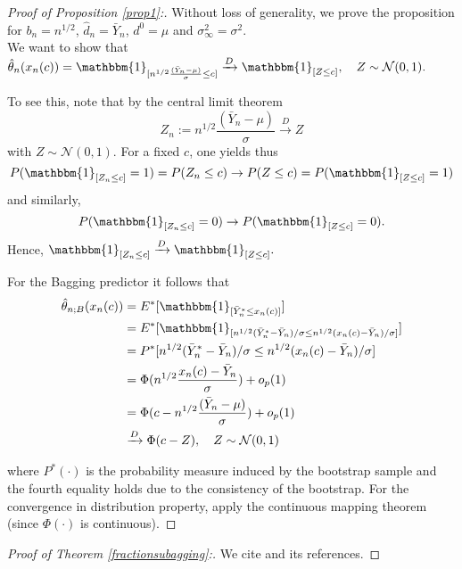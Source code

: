 \begin{proof}[Proof of Proposition \ref{prop1}:]
Without loss of generality, we prove the proposition for $b_n=n^{1/2}$, $\hat{d}_{n}=\bar{Y}_n$, $d^{0}=\mu$ and $\sigma^{2}_{\infty}=\sigma^{2}$.\\
We want to show that $\hat{\theta}_{n}(x_n(c))=\mathbbm{1}_{[n^{1/2}\frac{(\bar{Y}_{n} - \mu )}{\sigma} \leq c]} \xrightarrow{D} \mathbbm{1}_{[Z \leq c]}, \quad
Z \sim \mathcal{N}(0,1).$

To see this, note that by the central limit theorem
$$ Z_n := n^{1/2}\frac{(\bar{Y}_{n} - \mu )}{\sigma} \xrightarrow{D} Z$$
with $Z \sim \mathcal{N}(0,1).$
For a fixed $c$, one yields thus
$$P(\mathbbm{1}_{[Z_n \leq c]}=1)=P(Z_n \leq c) \rightarrow P(Z \leq c)=P(\mathbbm{1}_{[Z \leq c]}=1)$$
and similarly,
$$P(\mathbbm{1}_{[Z_n \leq c]}=0) \rightarrow P(\mathbbm{1}_{[Z \leq c]}=0).$$
Hence, 
$\mathbbm{1}_{[Z_n \leq c]} \xrightarrow{D} \mathbbm{1}_{[Z \leq c]}.$

For the Bagging predictor it follows that
\begin{align*}
\hat{\theta}_{n;B}(x_{n}(c)) &=E^{*}[\mathbbm{1}_{[\bar{Y}_{n}^{*} \leq x_{n}(c)]}]\\
&=E^{*}[\mathbbm{1}_{[n^{1/2}(\bar{Y}_{n}^{*}-\bar{Y}_{n})/\sigma \leq n^{1/2}(x_{n}(c)-\bar{Y}_{n})/\sigma]}]\\
&=P^{*}[n^{1/2}(\bar{Y}_{n}^{*}-\bar{Y}_{n})/\sigma \leq n^{1/2}(x_{n}(c)-\bar{Y}_{n})/\sigma]\\
&=\Phi(n^{1/2}\frac{x_{n}(c)-\bar{Y}_{n}}{\sigma})+o_{p}(1)\\
&=\Phi(c-n^{1/2}\frac{(\bar{Y}_{n} - \mu )}{\sigma})+o_{p}(1)\\
&\xrightarrow{D} \Phi(c-Z), \quad Z \sim \mathcal{N}(0,1)
\end{align*}

where $P^{*}(\cdot)$ is the probability measure induced by the bootstrap sample and the fourth equality holds due to the consistency of the bootstrap. 
For the convergence in distribution property, apply the continuous mapping theorem (since $\Phi(\cdot)$ is continuous).
\end{proof}

\begin{proof}[Proof of Theorem \ref{fractionsubagging}:] We cite \cite{Buhlmann2002} and its references.
\end{proof}